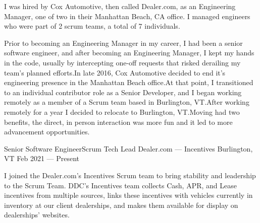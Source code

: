 

\begin{cvparagraph}
I was hired by Cox Automotive, then called Dealer.com, as an
Engineering Manager, one of two in their Manhattan Beach, CA office.
I managed engineers who were part of 2 scrum teams, a total of 7
individuals.
\end{cvparagraph}


\begin{cvparagraph}
Prior to becoming an Engineering Manager in my career, I had been a
senior software engineer, and after becoming an Engineering Manager, I kept my
hands in the code, usually by intercepting one-off requests that
risked derailing my team's planned efforts.\@ In late 2016, Cox
Automotive decided to end it's engineering presence in the Manhattan
Beach office.\@ At that point, I transitioned to an individual contributor role as a
Senior Developer, and I began working remotely as a member of a Scrum team based
in Burlington, VT.\@ After working remotely for a year I decided to
relocate to Burlington, VT.\@ Moving had two benefits, the direct, in
person interaction was more fun and it led to more advancement opportunities.
\end{cvparagraph}


\begin{cventries}
  \cventry
    {Senior Software Engineer{\enskip\cdotp\enskip}Scrum Tech Lead} %
    {Dealer.com --- Incentives} %
    {Burlington, VT} %
    {Feb 2021 --- Present} %
    {}
\end{cventries}
\vspace{-6.00mm}

\begin{cvparagraph}
I joined the Dealer.com's Incentives Scrum team to bring stability and leadership to the Scrum Team.
DDC's Incentives team collects Cash, APR, and Lease incentives from multiple sources,
links these incentives with vehicles currently in inventory at our client dealerships,
and makes them available for display on dealerships' websites.
\end{cvparagraph}

